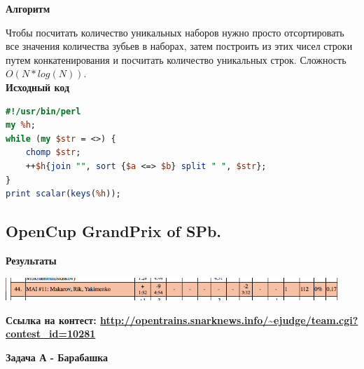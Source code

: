\documentclass[a4paper,12pt]{article}
\begin{document}
\textbf{{\large Алгоритм}}

Чтобы посчитать количество уникальных наборов нужно просто отсортировать все значения количества зубьев в наборах, затем построить из этих чисел строки путем конкатенирования и посчитать количество уникальных строк. Сложность $O(N * log(N))$. \\

\textbf{{\large Исходный код}} \\
\begin{lstlisting}[language=Perl]
#!/usr/bin/perl
my %h;
while (my $str = <>) {
	chomp $str;
	++$h{join "", sort {$a <=> $b} split " ", $str};
}
print scalar(keys(%h));
\end{lstlisting}







%
%
\newpage
\subsection{OpenCup GrandPrix of SPb.}

\textbf{{\large Результаты}} \\
\begin{center}
\includegraphics[width=0.95\textwidth]{OC_SPB/OC_SPB_result.png}\\ [1cm]
\end{center}

\textbf{{\large Ссылка на контест: \url{http://opentrains.snarknews.info/~ejudge/team.cgi?contest_id=10281}}}

\newpage
\textbf{{\large Задача А - Барабашка}}
\end{document}
